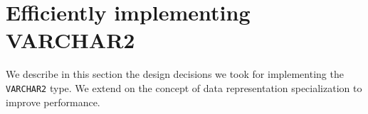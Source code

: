 \documentclass[twoside,11pt,a4paper]{article}
\newcommand{\pls}[1]{\texttt{#1}}
\newcommand{\plstype}[1]{\pls{#1}}
\newcommand{\varchar}{\plstype{VARCHAR2}}
\newcommand{\startsection}[1]{
	\cleardoublepage
	\section{#1}
	\thispagestyle{basic}
}
\begin{document}

\startsection{Efficiently implementing VARCHAR2}
\label{sec:varcharimpl}

We describe in this section the design decisions we took for implementing the \varchar{} type. We extend on the concept of data representation specialization to improve performance.

\end{document}
